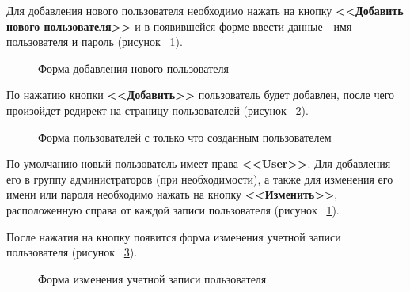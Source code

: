 \documentclass[a4paper]{article}
\begin{document}
Для добавления нового пользователя необходимо нажать на кнопку \textbf{<<Добавить нового пользователя>>} и в появившейся форме ввести данные - имя пользователя и пароль (рисунок ~\ref{fig:image6}).

\begin{figure}[h]
\caption{Форма добавления нового пользователя}
\label{fig:image6}
\end{figure}

По нажатию кнопки \textbf{<<Добавить>>} пользователь будет добавлен, после чего произойдет редирект на страницу пользователей (рисунок ~\ref{fig:image7}). 

\begin{figure}[h]
\caption{Форма пользователей с только что созданным пользователем}
\label{fig:image7}
\end{figure}

По умолчанию новый пользователь имеет права \textbf{<<User>>}. Для добавления его в группу администраторов (при необходимости), а также для изменения его имени или пароля необходимо нажать на кнопку \textbf{<<Изменить>>}, расположенную справа от каждой записи пользователя (рисунок ~\ref{fig:image6}).

После нажатия на кнопку появится форма изменения учетной записи пользователя (рисунок ~\ref{fig:image8}).

\begin{figure}[h]
\caption{Форма изменения учетной записи пользователя}
\label{fig:image8}
\end{figure}
\end{document}
